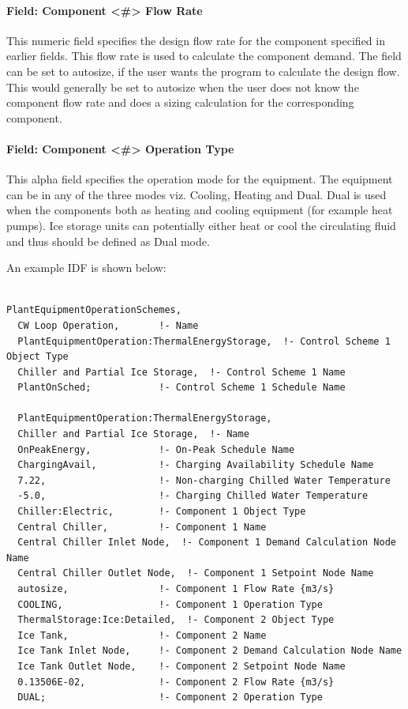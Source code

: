 \paragraph{Field: Component \textless{}\#\textgreater{} Flow Rate}\label{field-component-flow-rate-1}

This numeric field specifies the design flow rate for the component specified in earlier fields. This flow rate is used to calculate the component demand. The field can be set to autosize, if the user wants the program to calculate the design flow. This would generally be set to autosize when the user does not know the component flow rate and does a sizing calculation for the corresponding component.

\paragraph{Field: Component \textless{}\#\textgreater{} Operation Type}\label{field-component-operation-type}

This alpha field specifies the operation mode for the equipment. The equipment can be in any of the three modes viz. Cooling, Heating and Dual. Dual is used when the components both as heating and cooling equipment (for example heat pumps). Ice storage units can potentially either heat or cool the circulating fluid and thus should be defined as Dual mode.

An example IDF is shown below:

\begin{lstlisting}

PlantEquipmentOperationSchemes,
  CW Loop Operation,       !- Name
  PlantEquipmentOperation:ThermalEnergyStorage,  !- Control Scheme 1 Object Type
  Chiller and Partial Ice Storage,  !- Control Scheme 1 Name
  PlantOnSched;            !- Control Scheme 1 Schedule Name

  PlantEquipmentOperation:ThermalEnergyStorage,
  Chiller and Partial Ice Storage,  !- Name
  OnPeakEnergy,            !- On-Peak Schedule Name
  ChargingAvail,           !- Charging Availability Schedule Name
  7.22,                    !- Non-charging Chilled Water Temperature
  -5.0,                    !- Charging Chilled Water Temperature
  Chiller:Electric,        !- Component 1 Object Type
  Central Chiller,         !- Component 1 Name
  Central Chiller Inlet Node,  !- Component 1 Demand Calculation Node Name
  Central Chiller Outlet Node,  !- Component 1 Setpoint Node Name
  autosize,                !- Component 1 Flow Rate {m3/s}
  COOLING,                 !- Component 1 Operation Type
  ThermalStorage:Ice:Detailed,  !- Component 2 Object Type
  Ice Tank,                !- Component 2 Name
  Ice Tank Inlet Node,     !- Component 2 Demand Calculation Node Name
  Ice Tank Outlet Node,    !- Component 2 Setpoint Node Name
  0.13506E-02,             !- Component 2 Flow Rate {m3/s}
  DUAL;                    !- Component 2 Operation Type
\end{lstlisting}

